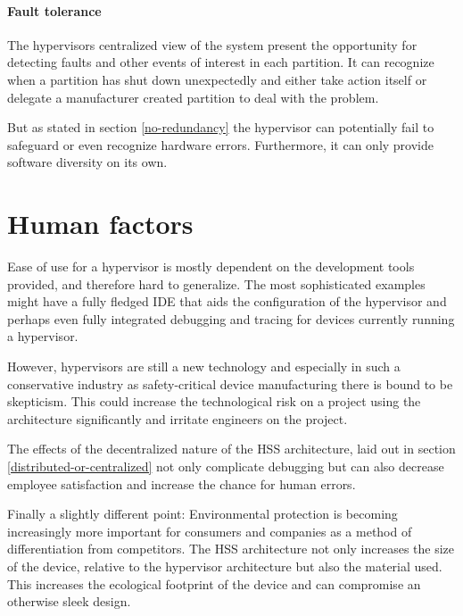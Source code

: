 \paragraph{Fault tolerance}
The hypervisors centralized view of the system present the opportunity for detecting faults and other events of interest in each partition. It can recognize when a partition has shut down unexpectedly and either take action itself or delegate a manufacturer created partition to deal with the problem.

But as stated in section \ref{no-redundancy} the hypervisor can potentially fail to safeguard or even recognize hardware errors. Furthermore, it can only provide software diversity on its own.


\section{Human factors}
Ease of use for a hypervisor is mostly dependent on the development tools provided, and therefore hard to generalize. The most sophisticated examples might have a fully fledged \gls{IDE} that aids the configuration of the hypervisor and perhaps even fully integrated debugging and tracing for devices currently running a hypervisor. %

However, hypervisors are still a new technology and especially in such a conservative industry as safety-critical device manufacturing there is bound to be skepticism. This could increase the technological risk on a project using the architecture significantly and irritate engineers on the project.

The effects of the decentralized nature of the \gls{HSS} architecture, laid out in section \ref{distributed-or-centralized} not only complicate debugging but can also decrease employee satisfaction and increase the chance for human errors.

Finally a slightly different point: Environmental protection is becoming increasingly more important for consumers and companies as a method of differentiation from competitors. The \gls{HSS} architecture not only increases the size of the device, relative to the hypervisor architecture but also the material used. This increases the ecological footprint of the device and can compromise an otherwise sleek design.


